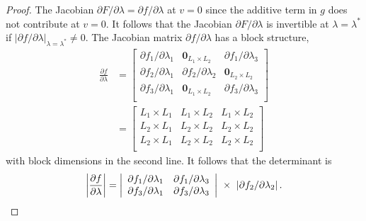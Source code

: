 \begin{proof}
  The Jacobian $\partial F/\partial \lambda=\partial f/\partial \lambda$ at $v=0$ since the additive term in $g$ does not contribute at $v=0$.
  It follows that the Jacobian $\partial F/\partial \lambda$ is invertible at $\lambda=\lambda^*$ if $\left\vert\partial f/\partial \lambda\right\vert_{\lambda=\lambda^*}\ne 0$. The Jacobian matrix $\partial f/\partial \lambda$ has a block structure,
  \begin{align*}
    \frac{\partial f}{\partial \lambda} & =\left[\begin{array}{ccc}
                                                     \partial f_1/\partial\lambda_1 & \mathbf{0}_{L_1\times L_2}     & \partial f_1/\partial\lambda_3 \\
                                                     \partial f_2/\partial\lambda_1 & \partial f_2/\partial\lambda_2 & \mathbf{0}_{L_2\times L_2}     \\
                                                     \partial f_3/\partial\lambda_1 & \mathbf{0}_{L_1\times L_2}     & \partial f_3/\partial\lambda_3 \\
                                                   \end{array}\right] \\[0.1in]
                                        & =\left[\begin{array}{ccc}
                                                     L_1 \times L_1 & L_1\times L_2  & L_1 \times L_2 \\
                                                     L_2 \times L_1 & L_2 \times L_2 & L_2\times L_2  \\
                                                     L_2 \times L_1 & L_2\times L_2  & L_2 \times L_2 \\
                                                   \end{array}\right]
  \end{align*}
  with block dimensions in the second line. It follows that the determinant is
  \[
    \left\vert\frac{\partial f}{\partial \lambda}\right\vert=\left\vert\begin{array}{cc}
      \partial f_1/\partial\lambda_1 & \partial f_1/\partial\lambda_3 \\
      \partial f_3/\partial\lambda_1 & \partial f_3/\partial\lambda_3 \\
    \end{array}\right\vert\ \times\ \left\vert\partial f_2/\partial\lambda_2 \right\vert.\\
\]
\end{proof}
